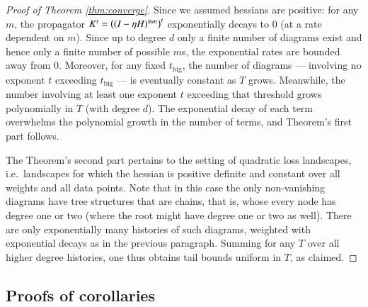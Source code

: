 
        \begin{proof}[Proof of Theorem \ref{thm:converge}]
            Since we assumed hessians are positive: for any $m$, the propagator
            $K^t = \left((I-\eta H)^{\otimes m}\right)^t$ exponentially decays to $0$
            (at a rate dependent on $m$).  Since up to degree $d$ only a finite
            number of diagrams exist and hence only a finite number of possible
            $m$s, the exponential rates are bounded away from $0$.  Moreover,
            for any fixed $t_{\text{big}}$, the number of diagrams ---
            involving no exponent $t$ exceeding $t_{\text{big}}$ --- is
            eventually constant as $T$ grows.  Meanwhile, the number involving
            at least one exponent $t$ exceeding that threshold grows
            polynomially in $T$ (with degree $d$).  The exponential decay of
            each term overwhelms the polynomial growth in the number of terms,
            and Theorem's first part follows.

            The Theorem's second part pertains to the setting of quadratic loss
            landscapes, i.e.\ landscapes for which the hessian is positive
            definite and constant over all weights and all data points.  Note
            that in this case the only non-vanishing diagrams have tree
            structures that are chains, that is, whose every node has degree
            one or two (where the root might have degree one or two as well).
            There are only exponentially many histories of such diagrams,
            weighted with exponential decays as in the previous paragraph. 
            Summing for any $T$ over all higher degree histories, 
            one thus obtains tail bounds uniform in $T$, as claimed.
        \end{proof}


    \subsection{Proofs of corollaries}                              \label{appendix:corollaries}

